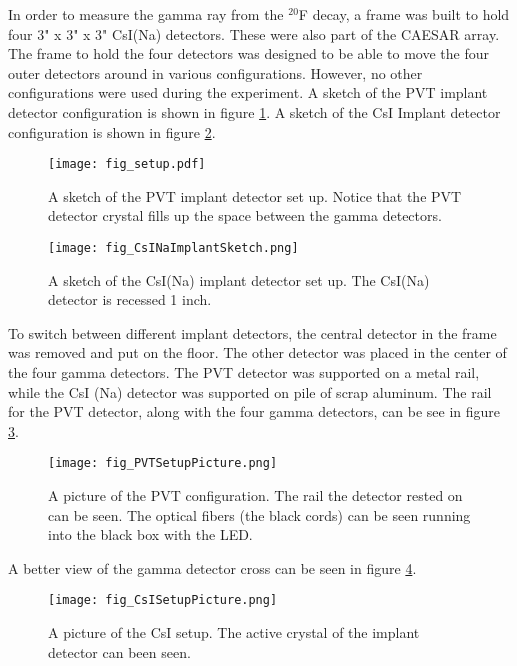 \documentclass[../MaxHughesThesis.tex]{subfiles}
\begin{document}
In order to measure the gamma ray from the $^{20}$F decay, a frame was built to hold four 3" x 3" x 3" CsI(Na) detectors.  
These were also part of the CAESAR array.
The frame to hold the four detectors was designed to be able to move the four outer detectors around in various configurations.
However, no other configurations were used during the experiment. 
A sketch of the PVT implant detector configuration is shown in figure \ref{fig:detsketch}.
A sketch of the CsI Implant detector configuration is shown in figure \ref{fig:csiimdetsketch}.

\begin{figure}
	\centerline{\texttt{[image: fig\_setup.pdf]}}
	\caption{A sketch of the PVT implant detector set up. 
		 Notice that the PVT detector crystal fills up the space between the gamma detectors.
		 }
	\label{fig:detsketch}
\end{figure}

\begin{figure}
	\centerline{\texttt{[image: fig\_CsINaImplantSketch.png]}}
	\caption{A sketch of the CsI(Na) implant detector set up. 
		    The CsI(Na) detector is recessed 1 inch. 
			}
	\label{fig:csiimdetsketch}
\end{figure}
To switch between different implant detectors, the central detector in the frame was removed and put on the floor.
The other detector was placed in the center of the four gamma detectors.
The PVT detector was supported on a metal rail, while the CsI (Na) detector was supported on pile of scrap aluminum.
The rail for the PVT detector, along with the four gamma detectors,  can be see in figure \ref{fig:PVTPicture}.

\begin{figure}
	\centerline{\texttt{[image: fig\_PVTSetupPicture.png]}}
	\caption{A picture of the PVT configuration. 
		 The rail the detector rested on can be seen.
		 The optical fibers (the black cords) can be seen running into the black box with the LED.
		 }
	\label{fig:PVTPicture}
\end{figure}
A better view of the gamma detector cross can be seen in figure \ref{fig:CsIPicture}.

\begin{figure}
	\centerline{\texttt{[image: fig\_CsISetupPicture.png]}}
	\caption{A picture of the CsI setup.
		 The active crystal of the implant detector can been seen. 
		 }
	\label{fig:CsIPicture}
\end{figure}
\end{document}
